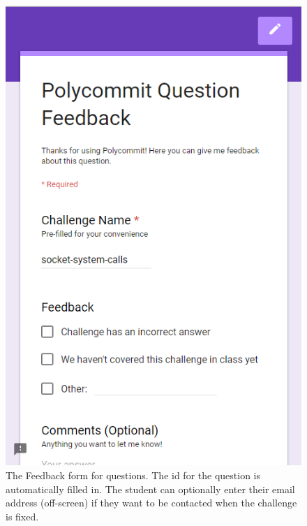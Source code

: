 \begin{figure}
	\includegraphics{figures/pc-feedback}
	\caption{The Feedback form for questions. The id for the question is automatically filled in. The student can optionally enter their email address (off-screen) if they want to be contacted when the challenge is fixed.}
	\label{fig:polycommit4}
\end{figure}

